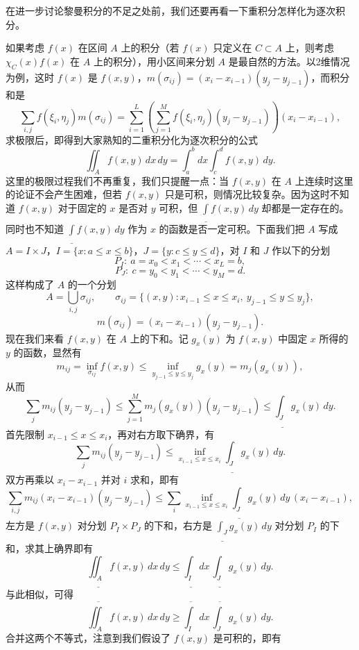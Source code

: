 在进一步讨论黎曼积分的不足之处前，我们还要再看一下重积分怎样化为逐次积分。

如果考虑 $f(x)$ 在区间 $A$ 上的积分（若 $f(x)$ 只定义在 $C\subset A$ 上，则考虑 $\chi_C(x)f(x)$ 在 $A$ 上的积分），用小区间来分划 $A$ 是最自然的方法。以2维情况为例，这时 $f(x)$ 是 $f(x,y)$，$m(\sigma_{ij})=(x_i-x_{i-1})(y_j-y_{j-1})$，而积分和是
\[
 \sum_{i,j}f(\xi_i,\eta_j)m(\sigma_{ij})
 =\sum_{i=1}^{L}\left(\sum_{j=1}^{M}f(\xi_i,\eta_j)(y_j-y_{j-1})\right)(x_i-x_{i-1}),
\]
求极限后，即得到大家熟知的二重积分化为逐次积分的公式
\begin{equation}
 \iint_A f(x,y)\,dx\,dy=\int_a^b dx\int_c^d f(x,y)\,dy.
 \tag{26}
\end{equation}
这里的极限过程我们不再重复，我们只提醒一点：当 $f(x,y)$ 在 $A$ 上连续时这里的论证不会产生困难，但若 $f(x,y)$ 只是可积，则情况比较复杂。因为这时不知道 $f(x,y)$ 对于固定的 $x$ 是否对 $y$ 可积，但 $\underline{\int}f(x,y)\,dy$ 却都是一定存在的。同时也不知道 $\underline{\int}f(x,y)\,dy$ 作为 $x$ 的函数是否一定可积。下面我们把 $A$ 写成 $A=I\times J$，$I=\{x:a\le x\le b\}$，$J=\{y:c\le y\le d\}$，对 $I$ 和 $J$ 作以下的分划
\[
 P_I:\ a=x_0<x_1<\cdots<x_L=b,
\]
\[
 P_J:\ c=y_0<y_1<\cdots<y_M=d.
\]
这样构成了 $A$ 的一个分划
\[
 A=\bigcup_{i,j}\sigma_{ij},\qquad
 \sigma_{ij}=\{(x,y):x_{i-1}\le x\le x_i,\ y_{j-1}\le y\le y_j\},
\]
\[
 m(\sigma_{ij})=(x_i-x_{i-1})(y_j-y_{j-1}).
\]
现在我们来看 $f(x,y)$ 在 $A$ 上的下和。记 $g_x(y)$ 为 $f(x,y)$ 中固定 $x$ 所得的 $y$ 的函数，显然有
\[
 m_{ij}=\inf_{\sigma_{ij}}f(x,y)\le\inf_{y_{j-1}\le y\le y_j}g_x(y)=m_j(g_x(y)),
\]
从而
\[
 \sum_j m_{ij}(y_j-y_{j-1})\le\sum_{j=1}^{M}m_j(g_x(y))(y_j-y_{j-1})
 \le\underline{\int_J} g_x(y)\,dy.
\]
首先限制 $x_{i-1}\le x\le x_i$，再对右方取下确界，有
\[
 \sum_jm_{ij}(y_j-y_{j-1})\le\inf_{x_{i-1}\le x\le x_i}\underline{\int_J}g_x(y)\,dy.
\]
双方再乘以 $x_i-x_{i-1}$ 并对 $i$ 求和，即有
\[
 \sum_{i,j}m_{ij}(x_i-x_{i-1})(y_j-y_{j-1})
 \le\sum_i\inf_{x_{i-1}\le x\le x_i}\underline{\int_J}g_x(y)\,dy\,(x_i-x_{i-1}),
\]
左方是 $f(x,y)$ 对分划 $P_I\times P_J$ 的下和，右方是 $\underline{\int_J}g_x(y)\,dy$ 对分划 $P_I$ 的下和，求其上确界即有
\begin{equation}
 \underline{\iint_A} f(x,y)\,dx\,dy\le
 \underline{\int_I} dx\,\underline{\int_J}g_x(y)\,dy.
 \tag{27}
\end{equation}
与此相似，可得
\begin{equation}
 \overline{\iint_A} f(x,y)\,dx\,dy\ge
 \overline{\int_I} dx\,\overline{\int_J}g_x(y)\,dy.
 \tag{28}
\end{equation}
合并这两个不等式，注意到我们假设了 $f(x,y)$ 是可积的，即有
